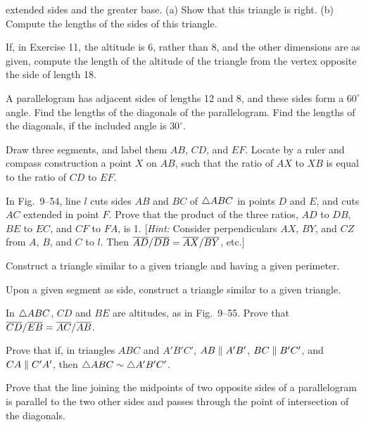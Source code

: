 \documentclass[11pt]{book}
\begin{document}
\begin{exlist}
      extended sides and the greater base. (a) Show that this triangle is right.
      (b) Compute the lengths of the sides of this triangle.
\exfig{\FIGIXFIFTYTHREE}
\item[12.] If, in Exercise 11, the altitude is 6, rather than 8, and the other
      dimensions are as given, compute the length of the altitude of the
      triangle from the vertex opposite the side of length 18.
\item[13.] A parallelogram has adjacent sides of lengths 12 and 8, and these
      sides form a $60^\circ$ angle. Find the lengths of the diagonals of the
      parallelogram. Find the lengths of the diagonals, if the included angle is
      $30^\circ$.
\item[14.] Draw three segments, and label them $AB$, $CD$, and $EF$. Locate by a
      ruler and compass construction a point $X$ on $AB$, such that the ratio of
      $AX$ to $XB$ is equal to the ratio of $CD$ to $EF$.
\item[\stex 15.] In Fig.~9--54, line $l$ cuts sides $AB$ and $BC$ of $\triangle ABC$
      in points $D$ and $E$, and cuts $AC$ extended in point $F$. Prove that the
      product of the three ratios, $AD$ to $DB$, $BE$ to $EC$, and $CF$ to $FA$,
      is 1. [\emph{Hint:} Consider perpendiculars $AX$, $BY$, and $CZ$ from $A$,
      $B$, and $C$ to $l$. Then $\overline{AD}/\overline{DB} = \overline{AX}/\overline{BY}$, etc.]
\exfig{\FIGIXFIFTYFOUR}
\item[16.] Construct a triangle similar to a given triangle and having a given
      perimeter.
\item[17.] Upon a given segment as side, construct a triangle similar to a given
      triangle.
\item[18.] In $\triangle ABC$, $CD$ and $BE$ are altitudes, as in Fig.~9--55. Prove
      that $\overline{CD}/\overline{EB} = \overline{AC}/\overline{AB}$.
\exfig{\FIGIXFIFTYFIVE}
\item[19.] Prove that if, in triangles $ABC$ and $A'B'C'$, $AB \mathrel{\|} A'B'$,
      $BC \mathrel{\|} B'C'$, and $CA \mathrel{\|} C'A'$, then $\triangle ABC \sim \triangle A'B'C'$.
\item[20.] Prove that the line joining the midpoints of two opposite sides of a
      parallelogram is parallel to the two other sides and passes through the
      point of intersection of the diagonals.
\end{exlist}
\end{document}
